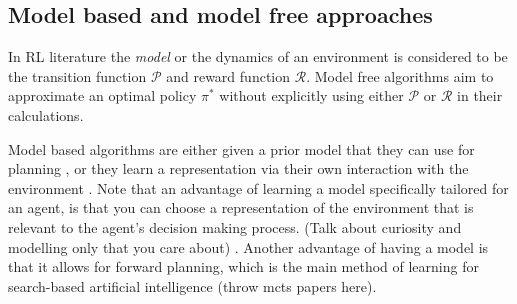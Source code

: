 \documentclass{../main.tex}{}
\begin{document}
\subsection{Model based and model free approaches}
In RL literature the \textit{model} or the dynamics of an environment is considered to be the transition function $\mathcal{P}$ and reward function $\mathcal{R}$. Model free algorithms aim to approximate an optimal policy $\pi^*$ without explicitly using either $\mathcal{P}$ or $\mathcal{R}$ in their calculations.

Model based algorithms are either given a prior model that they can use for planning \citep{browne2012survey, Soemers2014}, or they learn a representation via their own interaction with the environment \citep{Sutton1991, Guzdial2017, Deisenroth2011}. Note that an advantage of learning a model specifically tailored for an agent, is that you can choose a representation of the environment that is relevant to the agent's decision making process. (Talk about curiosity and modelling only that you care about) \citep{Pathak2017}. Another advantage of having a model is that it allows for forward planning, which is the main method of learning for search-based artificial intelligence (throw mcts papers here).
\end{document}
